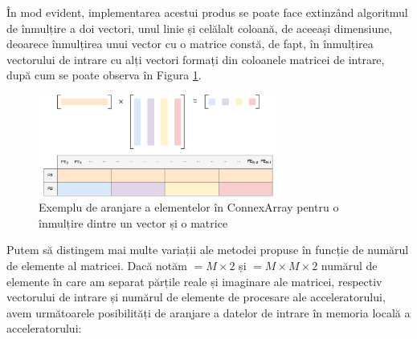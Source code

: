 În mod evident, implementarea acestui produs se poate face extinzând algoritmul
de înmulțire a doi vectori, unul linie și celălalt coloană, de aceeași
dimensiune, deoarece înmulțirea unui vector cu o matrice constă, de fapt, în
înmulțirea vectorului de intrare cu alți vectori formați din coloanele matricei
de intrare, după cum se poate observa în Figura \ref{fig:cnx-vec-mat}. \\

\begin{figure}[h]
    \centering
    \includegraphics[width=0.7\textwidth]{src/img/vec-matrix}
    \caption{Exemplu de aranjare a elementelor în ConnexArray pentru o înmulțire
    dintre un vector și o matrice}
    \label{fig:cnx-vec-mat}
\end{figure}

Putem să distingem mai multe variații ale metodei propuse în funcție de numărul
de elemente al matricei. Dacă notăm  $= M \times 2$ și
 $= M \times M \times 2$ numărul de elemente în care am
separat părțile reale și imaginare ale matricei, respectiv vectorului de intrare
și  numărul de elemente de procesare ale
acceleratorului, avem următoarele posibilități de aranjare a datelor de intrare
în memoria locală a acceleratorului:

